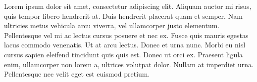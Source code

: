 \documentclass[
	11pt, %
	fleqn, %
	a4paper, %
]{LegrandOrangeBook}
\begin{document}
\begin{appendices}
Lorem ipsum dolor sit amet, consectetur adipiscing elit. Aliquam auctor mi risus, quis tempor libero hendrerit at. Duis hendrerit placerat quam et semper. Nam ultricies metus vehicula arcu viverra, vel ullamcorper justo elementum. Pellentesque vel mi ac lectus cursus posuere et nec ex. Fusce quis mauris egestas lacus commodo venenatis. Ut at arcu lectus. Donec et urna nunc. Morbi eu nisl cursus sapien eleifend tincidunt quis quis est. Donec ut orci ex. Praesent ligula enim, ullamcorper non lorem a, ultrices volutpat dolor. Nullam at imperdiet urna. Pellentesque nec velit eget est euismod pretium.


\end{appendices}

\end{document}
